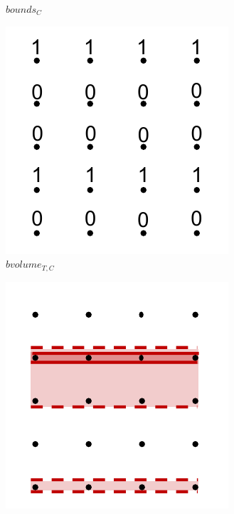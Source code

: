 \begin{figure}[!b]
\begin{subfigure}{0.243\linewidth}
\vspace{-5mm}
\caption{$bounds_{C}$}
\label{fig:boundsC}
\end{subfigure}
\begin{subfigure}{0.243\linewidth}
\includegraphics[width=\linewidth]{Images/bvolumeTC.pdf}
\vspace{-5mm}
\caption{$bvolume_{T,C}$}
\label{fig:bvolumeTC}
\end{subfigure}
\begin{subfigure}{0.243\linewidth}
\includegraphics[width=\linewidth]{Images/zlsT_fclsTC.pdf}

\end{subfigure}
\end{figure}
